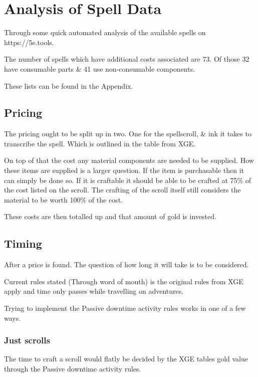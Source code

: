 \documentclass{article}
\begin{document}
    \section*{Analysis of Spell Data}

    Through some quick automated analysis of the available spells on https://5e.tools.    

    The number of spells which have additional costs associated are 73. Of those 32 have consumable parts \& 41 use non-consumable components. 

    These lists can be found in the Appendix.

    \subsection*{Pricing}

    The pricing ought to be split up in two. One for the spellscroll, \& ink it takes to transcribe the spell. Which is outlined in  the table from XGE. 

    On top of that the cost any material components are needed to be supplied. How these items are supplied is a larger question. If the item is purchasable then it can simply be done so. If it is craftable it should be able to be crafted at 75\% of the cost listed on the scroll. The crafting of the scroll itself still considers the material to be worth 100\% of the cost.

    These costs are then totalled up and that amount of gold is invested.

    \subsection*{Timing}

    After a price is found. The question of how long it will take is to be considered. 

    Current rules stated (Through word of mouth) is the original rules from XGE apply and time only passes while travelling on adventures. 

    Trying to implement the Passive downtime activity rules works in one of a few ways.

    \subsubsection*{Just scrolls}

    The time to craft a scroll would flatly be decided by the XGE tables gold value through the Passive downtime activity rules. 
\end{document}
